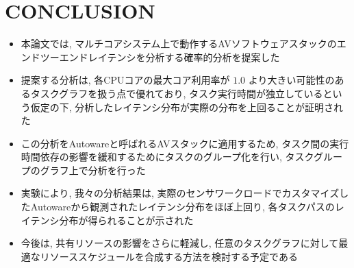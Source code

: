 
\section{CONCLUSION}
\label{sec: conclusion}

\begin{frame}{}
    \begin{itemize}
        \item 本論文では, マルチコアシステム上で動作するAVソフトウェアスタックのエンドツーエンドレイテンシを分析する確率的分析を提案した
\item 提案する分析は, 各CPUコアの最大コア利用率が $1.0$ より大きい可能性のあるタスクグラフを扱う点で優れており, タスク実行時間が独立しているという仮定の下, 分析したレイテンシ分布が実際の分布を上回ることが証明された
    \end{itemize}
\end{frame}

\begin{frame}{}
    \begin{itemize}
        \item この分析をAutowareと呼ばれるAVスタックに適用するため, タスク間の実行時間依存の影響を緩和するためにタスクのグループ化を行い, タスクグループのグラフ上で分析を行った
\item 実験により, 我々の分析結果は, 実際のセンサワークロードでカスタマイズしたAutowareから観測されたレイテンシ分布をほぼ上回り, 各タスクパスのレイテンシ分布が得られることが示された
\item 今後は, 共有リソースの影響をさらに軽減し, 任意のタスクグラフに対して最適なリソーススケジュールを合成する方法を検討する予定である
    \end{itemize}
\end{frame}
